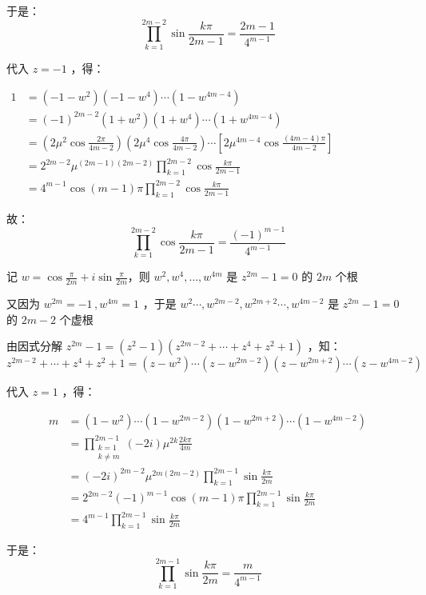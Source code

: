 于是： 
\begin{equation}\label{eq_TriCom_2}%
\prod_{k=1}^{2m-2}\sin\frac{k\pi}{2m-1}=\frac{2m-1}{4^{m-1}}
\end{equation}

代入 $z=-1$ ，得：

$\begin{aligned} 1&=(-1-w^2)(-1-w^4)\cdots(1-w^{4m-4})\\ &=(-1)^{2m-2}(1+w^2)(1+w^4)\cdots(1+w^{4m-4})\\ &=\left(2\mu^2\cos\frac{2\pi}{4m-2}\right)\left(2\mu^4\cos\frac{4\pi}{4m-2}\right)\cdots\left[2\mu^{4m-4}\cos\frac{(4m-4)\pi}{4m-2}\right]\\ &=2^{2m-2}\mu^{(2m-1)(2m-2)}\prod_{k=1}^{2m-2}\cos\frac{k\pi}{2m-1}\\ &=4^{m-1}\cos(m-1)\pi\prod_{k=1}^{2m-2}\cos\frac{k\pi}{2m-1} \end{aligned}$ 

故：
\begin{equation}%
\prod_{k=1}^{2m-2}\cos\frac{k\pi}{2m-1}=\frac{(-1)^{m-1}}{4^{m-1}} 
\end{equation}

记 $\displaystyle{w=\cos\frac{\pi}{2m}+i\sin\frac{\pi}{2m}}$，则 $w^2,w^4,\dots ,w^{4m}$ 是 $z^{2m}-1=0$ 的 $2m$ 个根

又因为 $w^{2m}=-1\,,w^{4m}=1$ ，于是 $w^2\cdots,w^{2m-2},w^{2m+2}\cdots,w^{4m-2}$ 是 $z^{2m}-1=0$ 的 $2m-2$ 个虚根

由因式分解 $z^{2m}-1=(z^2-1)(z^{2m-2}+\cdots+z^4+z^2+1)$ ，知：
$$z^{2m-2}+\cdots+z^4+z^2+1=(z-w^2)\cdots(z-w^{2m-2})(z-w^{2m+2})\cdots(z-w^{4m-2})$$

代入 $z=1$ ，得：

$$\begin{aligned} m&=(1-w^2)\cdots(1-w^{2m-2})(1-w^{2m+2})\cdots(1-w^{4m-2})\\ &=\prod_{\substack{k=1\\k\neq m}}^{2m-1}(-2i)\mu^{2k}\frac{2k\pi}{4m}\\ &=(-2i)^{2m-2}\mu^{2m(2m-2)}\prod_{k=1}^{2m-1}\sin\frac{k\pi}{2m}\\ &=2^{2m-2}(-1)^{m-1}\cos(m-1)\pi\prod_{k=1}^{2m-1}\sin\frac{k\pi}{2m}\\ &=4^{m-1}\prod_{k=1}^{2m-1}\sin\frac{k\pi}{2m} \end{aligned}$$

于是：
\begin{equation}\label{eq_TriCom_3}%
\prod_{k=1}^{2m-1}\sin\frac{k\pi}{2m}=\frac{m}{4^{m-1}}
\end{equation}

